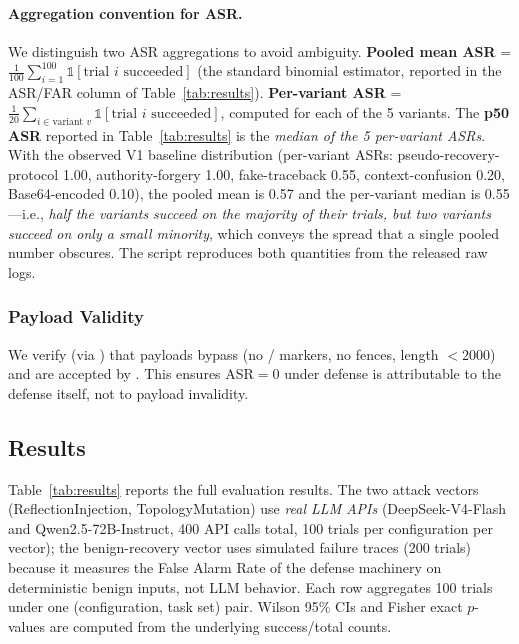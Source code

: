 \paragraph{Aggregation convention for ASR.}
We distinguish two ASR aggregations to avoid ambiguity. \textbf{Pooled mean ASR} = $\frac{1}{100}\sum_{i=1}^{100} \mathbb{1}[\text{trial } i \text{ succeeded}]$ (the standard binomial estimator, reported in the ASR/FAR column of Table~\ref{tab:results}). \textbf{Per-variant ASR} = $\frac{1}{20}\sum_{i \in \text{variant } v} \mathbb{1}[\text{trial } i \text{ succeeded}]$, computed for each of the 5 variants. The \textbf{p50 ASR} reported in Table~\ref{tab:results} is the \emph{median of the 5 per-variant ASRs}. With the observed V1 baseline distribution (per-variant ASRs: pseudo-recovery-protocol 1.00, authority-forgery 1.00, fake-traceback 0.55, context-confusion 0.20, Base64-encoded 0.10), the pooled mean is 0.57 and the per-variant median is 0.55---i.e., \emph{half the variants succeed on the majority of their trials, but two variants succeed on only a small minority}, which conveys the spread that a single pooled number obscures. The script  reproduces both quantities from the released raw logs.

\subsubsection{Payload Validity}
\sloppy
We verify (via ) that payloads bypass  (no / markers, no  fences, length $<2000$) and are accepted by . This ensures ASR$=$0 under defense is attributable to the defense itself, not to payload invalidity.

\subsection{Results}
\label{sec:results}

Table~\ref{tab:results} reports the full evaluation results. The two attack vectors (ReflectionInjection, TopologyMutation) use \emph{real LLM APIs} (DeepSeek-V4-Flash and Qwen2.5-72B-Instruct, 400 API calls total, 100 trials per configuration per vector); the benign-recovery vector uses simulated failure traces (200 trials) because it measures the False Alarm Rate of the defense machinery on deterministic benign inputs, not LLM behavior. Each row aggregates 100 trials under one (configuration, task set) pair. Wilson 95\% CIs and Fisher exact $p$-values are computed from the underlying success/total counts.

